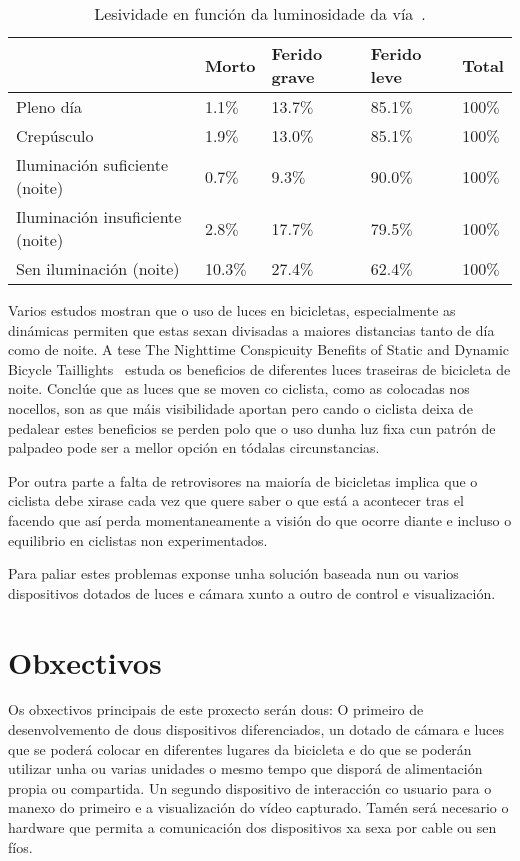 \begin{table}[tb]
  \caption{Lesividade en función da luminosidade da vía~\cite{ESTUDIOANALISISSINIESTRALIDAD}. }
  \label{tab:lesividade}
    \begin{center}
        \begin{tabular}{|l|l|l|l|l|}
            \hline
             & Morto & Ferido grave & Ferido leve & Total\\ \hline
             Pleno día & 1.1\(\%\)& 13.7\(\%\) & 85.1\(\%\)& 100\(\%\)\\ \hline
             Crepúsculo & 1.9\(\%\) & 13.0\(\%\) &85.1\(\%\) &100\(\%\)\\ \hline
             Iluminación suficiente (noite) &0.7\(\%\) &9.3\(\%\) &90.0\(\%\)  & 100\(\%\)\\ \hline
             Iluminación insuficiente (noite)  & 2.8\(\%\)& 17.7\(\%\)& 79.5\(\%\)& 100\(\%\)\\ \hline
             Sen iluminación (noite) & 10.3\(\%\)& 27.4\(\%\)&62.4\(\%\) & 100\(\%\) \\ \hline
        \end{tabular}
    \end{center}

\end{table}

Varios estudos mostran que o uso de luces en bicicletas, especialmente as dinámicas permiten que estas sexan divisadas a maiores distancias tanto de día como de noite. A tese The Nighttime Conspicuity Benefits of Static and Dynamic Bicycle Taillights~\cite{edewaardNighttimeConspicuityBenefits2017} estuda os beneficios de diferentes luces traseiras de bicicleta de noite. Conclúe que as luces que se moven co ciclista, como as colocadas nos nocellos, son as que máis visibilidade aportan pero cando o ciclista  deixa de pedalear estes beneficios se perden polo que o uso dunha luz fixa cun patrón de palpadeo pode ser a mellor opción en tódalas circunstancias.

Por outra parte a falta de retrovisores na maioría de bicicletas implica que o ciclista debe xirase cada vez que quere saber o que está a acontecer tras el facendo que así perda momentaneamente a visión do que ocorre diante e incluso o equilibrio en ciclistas non experimentados.

Para paliar estes problemas exponse unha solución baseada nun ou varios dispositivos dotados de luces e cámara xunto a outro de control e visualización.


\section{Obxectivos}
\label{sec:obxectivos}
Os obxectivos principais de este proxecto serán dous:
O primeiro de desenvolvemento de dous dispositivos diferenciados, un dotado de cámara e luces que se poderá colocar en diferentes lugares da bicicleta e do que se poderán utilizar unha ou varias unidades o mesmo tempo que disporá de alimentación propia ou compartida. Un segundo dispositivo de interacción co usuario para o manexo do primeiro e a visualización do vídeo capturado. Tamén será necesario o hardware que permita a comunicación dos dispositivos xa sexa por cable ou sen fíos.

